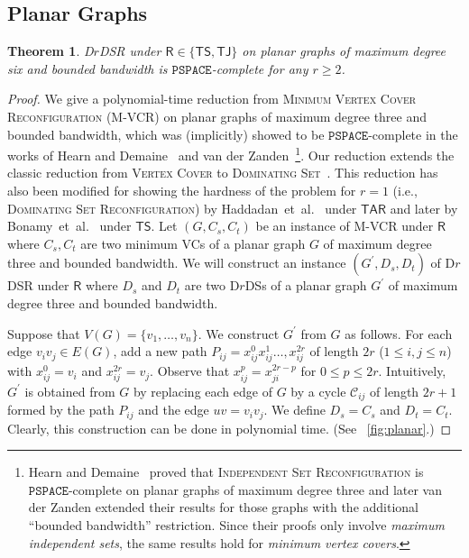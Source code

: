 \documentclass[a4paper]{article}
\theoremstyle{plain}
\newtheorem{theorem}{Theorem}
\theoremstyle{definition}
\newcommand{\sfTS}{{\mathsf{TS}}} %
\newcommand{\sfTJ}{{\mathsf{TJ}}} %
\newcommand{\sfTAR}{{\mathsf{TAR}}} %
\newcommand{\sfR}{{\mathsf{R}}} %
\newcommand{\ttPSPACE}{{\mathtt{PSPACE}}}
\begin{document}
\subsection{Planar Graphs}
\label{sec:planar}
\begin{theorem}\label{thm:planar}
	\textsc{D$r$DSR} under $\sfR \in \{\sfTS, \sfTJ\}$ on planar graphs of maximum degree six and bounded bandwidth is $\ttPSPACE$-complete for any $r \geq 2$.
\end{theorem}
\begin{proof}
	We give a polynomial-time reduction from \textsc{Minimum Vertex Cover Reconfiguration (M-VCR)} on planar graphs of maximum degree three and bounded bandwidth, which was (implicitly) showed to be $\ttPSPACE$-complete in the works of Hearn and Demaine~\cite{HearnD05} and van der Zanden~\cite{Zanden15}\footnote{Hearn and Demaine~\cite{HearnD05} proved that \textsc{Independent Set Reconfiguration} is $\ttPSPACE$-complete on planar graphs of maximum degree three and later van der Zanden extended their results for those graphs with the additional ``bounded bandwidth'' restriction. Since their proofs only involve \textit{maximum independent sets}, the same results hold for \textit{minimum vertex covers}.}.
	Our reduction extends the classic reduction from \textsc{Vertex Cover} to \textsc{Dominating Set}~\cite{GareyJohson1979}.
	This reduction has also been modified for showing the hardness of the problem for $r = 1$ (i.e., \textsc{Dominating Set Reconfiguration}) by Haddadan~et~al.~\cite{HaddadanIMNOST16} under $\sfTAR$ and later by Bonamy~et~al.~\cite{BonamyDO21} under $\sfTS$.
	Let $(G, C_s, C_t)$ be an instance of \textsc{M-VCR} under $\sfR$ where $C_s, C_t$ are two minimum VCs of a planar graph $G$ of maximum degree three and bounded bandwidth.
	We will construct an instance $(G^\prime, D_s, D_t)$ of \textsc{D$r$DSR} under $\sfR$ where $D_s$ and $D_t$ are two D$r$DSs of a planar graph $G^\prime$ of maximum degree three and bounded bandwidth.
	
	Suppose that $V(G) = \{v_1, \dots, v_n\}$.
	We construct $G^\prime$ from $G$ as follows.
	For each edge $v_iv_j \in E(G)$, add a new path $P_{ij} = x_{ij}^0x_{ij}^1\dots, x_{ij}^{2r}$ of length $2r$ ($1 \leq i, j \leq n$) with $x_{ij}^0 = v_i$ and $x_{ij}^{2r} = v_j$.
	Observe that $x_{ij}^p = x_{ji}^{2r-p}$ for $0 \leq p \leq 2r$.
	Intuitively, $G^\prime$ is obtained from $G$ by replacing each edge of $G$ by a cycle $\mathcal{C}_{ij}$ of length $2r+1$ formed by the path $P_{ij}$ and the edge $uv = v_iv_j$.
	We define $D_s = C_s$ and $D_t = C_t$.
	Clearly, this construction can be done in polynomial time.
	(See \figurename~\ref{fig:planar}.)
	

\end{proof}
\end{document}
